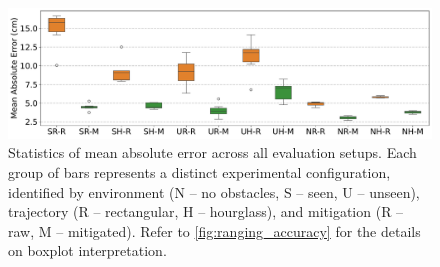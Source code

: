 \begin{figure}[tbh]
    \centering
    \includegraphics[width=\textwidth]{Graphics/dtw_errors_mae_box.pdf}
    \caption[Statistics of mean absolute error across all evaluation setups.]{Statistics of mean absolute error across all evaluation setups. Each group of bars represents a distinct experimental configuration, identified by environment (N – no obstacles, S – seen, U – unseen), trajectory (R – rectangular, H – hourglass), and mitigation (R – raw, M – mitigated). Refer to \autoref{fig:ranging_accuracy} for the details on boxplot interpretation.}
    \label{fig:dtw_errors_mae_box}
\end{figure}





